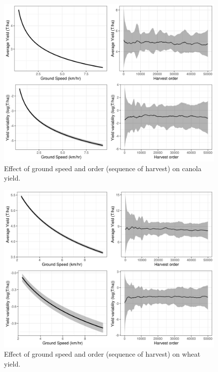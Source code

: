 \documentclass[]{elsarticle} %
\begin{document}
\begin{figure}
\includegraphics[width=1\linewidth]{../Figures/groundSpeed_canola} \caption{Effect of ground speed and order (sequence of harvest) on canola yield.}\label{fig:canolaPlotSpeed}
\end{figure}

\begin{figure}
\includegraphics[width=1\linewidth]{../Figures/groundSpeed_wheat} \caption{Effect of ground speed and order (sequence of harvest) on wheat yield.}\label{fig:wheatPlotSpeed}
\end{figure}
\end{document}
